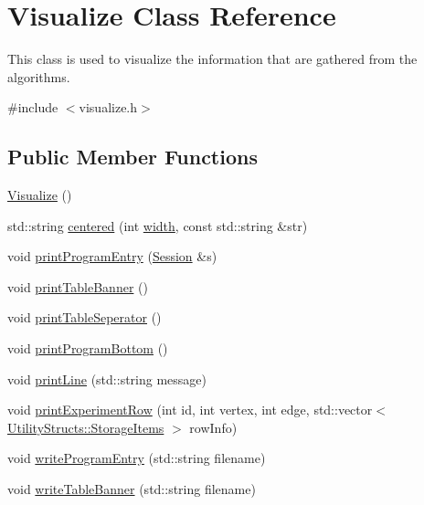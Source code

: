 \hypertarget{class_visualize}{}\section{Visualize Class Reference}
\label{class_visualize}


This class is used to visualize the information that are gathered from the algorithms.  




{\ttfamily \#include $<$visualize.\+h$>$}

\subsection*{Public Member Functions}
\begin{DoxyCompactItemize}
\item 
\hyperlink{class_visualize_a8d4163ad53518ec0c8a3eaec2bf2fe7b}{Visualize} ()
\item 
std\+::string \hyperlink{class_visualize_a9d34d81d684587b8b2b8bf70031f1670}{centered} (int \hyperlink{class_visualize_af5ac723ad5f8fe8c4a8378bf1299cda7}{width}, const std\+::string \&str)
\item 
void \hyperlink{class_visualize_a29f27ff8c5e59163eea2be42ff372405}{print\+Program\+Entry} (\hyperlink{struct_session}{Session} \&s)
\item 
void \hyperlink{class_visualize_a3e1aa31f14abdf3cf53662cddc536c6a}{print\+Table\+Banner} ()
\item 
void \hyperlink{class_visualize_a2d38641cb335d7bbf7e11567b07e2d85}{print\+Table\+Seperator} ()
\item 
void \hyperlink{class_visualize_ac0be9ece2d80a7d1e34724fb87424216}{print\+Program\+Bottom} ()
\item 
void \hyperlink{class_visualize_abce6cd538dc0715b21851e0bf0377d85}{print\+Line} (std\+::string message)
\item 
void \hyperlink{class_visualize_a52a0dfaf625bd3ac294a00e3161094cf}{print\+Experiment\+Row} (int id, int vertex, int edge, std\+::vector$<$ \hyperlink{struct_utility_structs_1_1_storage_items}{Utility\+Structs\+::\+Storage\+Items} $>$ row\+Info)
\item 
void \hyperlink{class_visualize_a6e27b451c2662681cb3119e9ff1c22da}{write\+Program\+Entry} (std\+::string filename)
\item 
void \hyperlink{class_visualize_a14c9e9721eeaca0afde25da0138b43b8}{write\+Table\+Banner} (std\+::string filename)
\item 

\end{DoxyCompactItemize}
